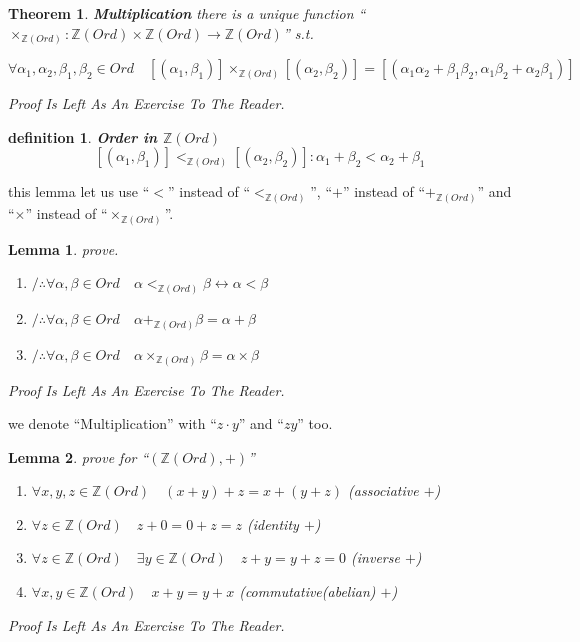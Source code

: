 \documentclass[10pt,a4paper]{book}
\newtheorem{definition}{definition}[section]
\newtheorem{theorem}{Theorem}[section]
\newtheorem{lemma}{Lemma}[section]
\begin{document}
\begin{theorem}\textbf{Multiplication} there is a unique function ``$\times_{\mathbb{Z} (Ord)} :\mathbb{Z} (Ord) \times \mathbb{Z} (Ord) \to \mathbb{Z} (Ord)$'' s.t.

    \[ \forall \alpha_1 , \alpha_2 , \beta_1 , \beta_2 \in Ord \quad [(\alpha_1 , \beta_1)] \times_{\mathbb{Z} (Ord)} [(\alpha_2 , \beta_2)]  = [(\alpha_1 \alpha_2  + \beta_1 \beta_2 , \alpha_1 \beta_2 + \alpha_2 \beta_1)] \]

    Proof Is Left As An Exercise To The Reader.
\end{theorem}

\begin{definition}\textbf{Order in $\mathbb{Z} (Ord)$}
    \[ [(\alpha_1 , \beta_1)] <_{{\mathbb{Z} (Ord)}} [(\alpha_2 , \beta_2)]  : \alpha_1 + \beta_2  < \alpha_2 + \beta_1 \]
\end{definition}

this lemma let us use ``$<$'' instead of ``$<_{\mathbb{Z} (Ord)}$'', ``$+$''
instead of ``$+_{\mathbb{Z} (Ord)}$'' and ``$\times$'' instead of
``$\times_{\mathbb{Z} (Ord)}$''.

\begin{lemma}prove.
    \begin{enumerate}
        \setlength{\itemsep}{0pt} %
        \item       $/ \therefore   \forall \alpha , \beta  \in Ord \quad \alpha  <_{\mathbb{Z} (Ord)}  \beta   \leftrightarrow \alpha   <  \beta $
        \item       $/ \therefore   \forall \alpha , \beta  \in Ord \quad \alpha  +_{\mathbb{Z} (Ord)}  \beta   = \alpha   +  \beta $
        \item       $/ \therefore   \forall \alpha , \beta  \in Ord \quad \alpha  \times_{\mathbb{Z} (Ord)}  \beta   = \alpha   \times  \beta $
    \end{enumerate}
    Proof Is Left As An Exercise To The Reader.
\end{lemma}

we denote ``Multiplication'' with ``$z \cdot y$'' and ``$z y$'' too.

\begin{lemma}prove for  ``$ (\mathbb{Z} (Ord) , +  )  $''
    \begin{enumerate}
        \setlength{\itemsep}{0pt} %
        \item       $\forall x ,y ,z  \in \mathbb{Z} (Ord) \quad (x + y )+ z  = x + (y + z )  $ (associative $+ $)
        \item       $\forall z \in \mathbb{Z} (Ord) \quad z +  0 = 0 +  z = z$ (identity  $+ $)
        \item       $\forall z \in \mathbb{Z} (Ord) \quad \exists y \in \mathbb{Z} (Ord) \quad z +  y = y +  z = 0$  (inverse  $+ $)
        \item       $\forall x ,y  \in \mathbb{Z} (Ord) \quad x + y  = y + x $   (commutative(abelian)  $+ $)
    \end{enumerate}
    Proof Is Left As An Exercise To The Reader.
\end{lemma}
\end{document}
